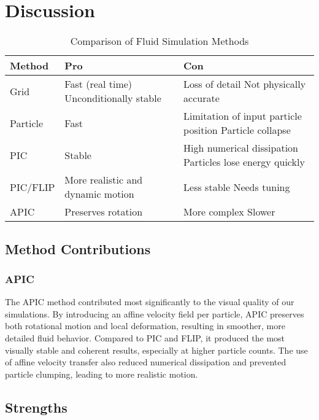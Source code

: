 \section{Discussion}
\begin{table}[!htbp]
\centering
\caption{Comparison of Fluid Simulation Methods}
\label{tab:fluid_comparison}
\begin{tabularx}{\columnwidth}{l X X}
\toprule
\textbf{Method} & \textbf{Pro} & \textbf{Con} \\
\midrule
Grid&
Fast (real time) \newline
Unconditionally stable &
Loss of detail \newline
Not physically accurate \\
\midrule
Particle&
Fast &
Limitation of input particle position \newline
Particle collapse \\
\midrule
PIC&
Stable &
High numerical dissipation \newline
Particles lose energy quickly \\
\midrule
PIC/FLIP &
More realistic and dynamic motion &
Less stable \newline
Needs tuning \\
\midrule
APIC &
Preserves rotation &
More complex \newline
Slower \\
\bottomrule
\end{tabularx}
\end{table}

\subsection{Method Contributions}
\subsubsection{APIC}
The APIC method contributed most significantly to the visual quality of our simulations. By introducing an affine velocity field per particle, APIC preserves both rotational motion and local deformation, resulting in smoother, more detailed fluid behavior. Compared to PIC and FLIP, it produced the most visually stable and coherent results, especially at higher particle counts. The use of affine velocity transfer also reduced numerical dissipation and prevented particle clumping, leading to more realistic motion.

\subsection{Strengths}
